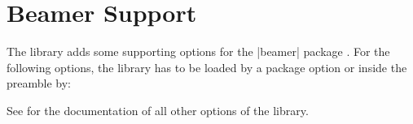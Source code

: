 \clearpage
\section{Beamer Support}\label{sec:beamer}%
%
The  library adds some supporting options for the |beamer| package
\cite{tantau:beamer}.
For the following options, the  library has to be loaded
by a package option or inside the preamble by:
\begin{dispListing}
\end{dispListing}

See  for the documentation of all other options of the  library.


